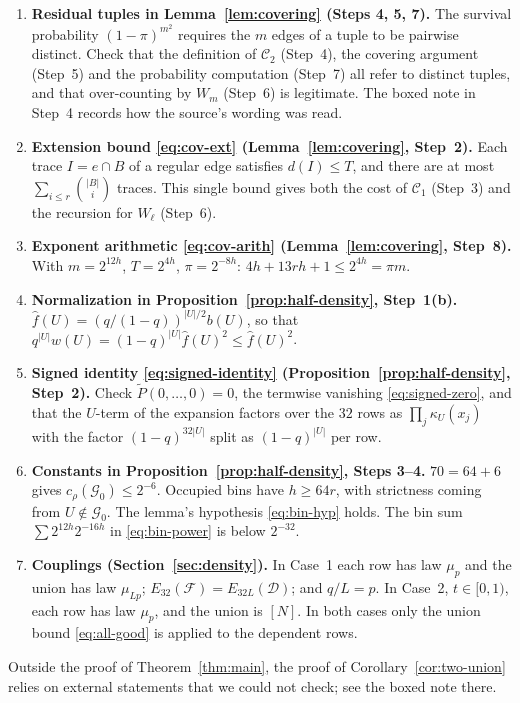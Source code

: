\documentclass[11pt,letterpaper]{article}
\theoremstyle{definition}
\theoremstyle{remark}
\numberwithin{equation}{section}
\begin{document}
\begin{enumerate}
\item \textbf{Residual tuples in Lemma~\ref{lem:covering} (Steps 4, 5, 7).}
The survival probability $(1-\pi)^{m^2}$ requires the $m$ edges of a tuple to
be pairwise distinct. Check that the definition of $\mathcal C_2$ (Step~4),
the covering argument (Step~5) and the probability computation (Step~7) all
refer to distinct tuples, and that over-counting by $W_m$ (Step~6) is
legitimate. The boxed note in Step~4 records how the source's wording was
read.
\item \textbf{Extension bound \eqref{eq:cov-ext} (Lemma~\ref{lem:covering},
Step~2).} Each trace $I=e\cap B$ of a regular edge satisfies $d(I)\le T$, and
there are at most $\sum_{i\le r}\binom{|B|}{i}$ traces. This single bound
gives both the cost of $\mathcal C_1$ (Step~3) and the recursion for $W_\ell$
(Step~6).
\item \textbf{Exponent arithmetic \eqref{eq:cov-arith}
(Lemma~\ref{lem:covering}, Step~8).} With $m=2^{12h}$, $T=2^{4h}$,
$\pi=2^{-8h}$: $4h+13rh+1\le2^{4h}=\pi m$.
\item \textbf{Normalization in Proposition~\ref{prop:half-density}, Step~1(b).}
$\widehat f(U)=(q/(1-q))^{|U|/2}b(U)$, so that
$q^{|U|}w(U)=(1-q)^{|U|}\widehat f(U)^2\le\widehat f(U)^2$.
\item \textbf{Signed identity \eqref{eq:signed-identity}
(Proposition~\ref{prop:half-density}, Step~2).} Check
$\widetilde P(0,\ldots,0)=0$, the termwise vanishing \eqref{eq:signed-zero},
and that the $U$-term of the expansion factors over the $32$ rows as
$\prod_j\kappa_U(x_j)$ with the factor $(1-q)^{32|U|}$ split as $(1-q)^{|U|}$
per row.
\item \textbf{Constants in Proposition~\ref{prop:half-density}, Steps 3--4.}
$70=64+6$ gives $c_\rho(\mathcal G_0)\le2^{-6}$. Occupied bins have $h\ge64r$,
with strictness coming from $U\notin\mathcal G_0$. The lemma's hypothesis
\eqref{eq:bin-hyp} holds. The bin sum $\sum2^{12h}2^{-16h}$ in
\eqref{eq:bin-power} is below $2^{-32}$.
\item \textbf{Couplings (Section~\ref{sec:density}).} In Case~1 each row has
law $\mu_p$ and the union has law $\mu_{Lp}$; $E_{32}(\mathcal
F)=E_{32L}(\mathcal D)$; and $q/L=p$. In Case~2, $t\in[0,1)$, each row has
law $\mu_p$, and the union is $[N]$. In both cases only the union bound
\eqref{eq:all-good} is applied to the dependent rows.
\end{enumerate}

Outside the proof of Theorem~\ref{thm:main}, the proof of
Corollary~\ref{cor:two-union} relies on external statements that we could not
check; see the boxed note there.
\end{document}
